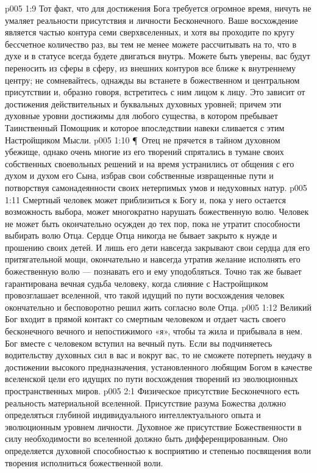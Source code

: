 \vs p005 1:9 Тот факт, что для достижения Бога требуется огромное время, ничуть не умаляет реальности присутствия и личности Бесконечного. Ваше восхождение является частью контура семи сверхвселенных, и хотя вы проходите по кругу бессчетное количество раз, вы тем не менее можете рассчитывать на то, что в духе и в статусе всегда будете двигаться внутрь. Можете быть уверены, вас будут переносить из сферы в сферу, из внешних контуров все ближе к внутреннему центру; не сомневайтесь, однажды вы встанете в божественном и центральном присутствии и, образно говоря, встретитесь с ним лицом к лицу. Это зависит от достижения действительных и буквальных духовных уровней; причем эти духовные уровни достижимы для любого существа, в котором пребывает Таинственный Помощник и которое впоследствии навеки сливается с этим Настройщиком Мысли.
\vs p005 1:10 \P\ Отец не прячется в тайном духовном убежище, однако очень многие из его творений спрятались в тумане своих собственных своевольных решений и на время устранились от общения с его духом и духом его Сына, избрав свои собственные извращенные пути и потворствуя самонадеянности своих нетерпимых умов и недуховных натур.
\vs p005 1:11 Смертный человек может приблизиться к Богу и, пока у него остается возможность выбора, может многократно нарушать божественную волю. Человек не может быть окончательно осужден до тех пор, пока не утратит способности выбирать волю Отца. Сердце Отца никогда не бывает закрыто к нужде и прошению своих детей. И лишь его дети навсегда закрывают свои сердца для его притягательной мощи, окончательно и навсегда утратив желание исполнять его божественную волю --- познавать его и ему уподобляться. Точно так же бывает гарантирована вечная судьба человеку, когда слияние с Настройщиком провозглашает вселенной, что такой идущий по пути восхождения человек окончательно и бесповоротно решил жить согласно воле Отца.
\vs p005 1:12 Великий Бог входит в прямой контакт со смертным человеком и отдает часть своего бесконечного вечного и непостижимого «я», чтобы та жила и прибывала в нем. Бог вместе с человеком вступил на вечный путь. Если вы подчиняетесь водительству духовных сил в вас и вокруг вас, то не сможете потерпеть неудачу в достижении высокого предназначения, установленного любящим Богом в качестве вселенской цели его идущих по пути восхождения творений из эволюционных пространственных миров.
\vs p005 2:1 Физическое присутствие Бесконечного есть реальность материальной вселенной. Присутствие разума Божества должно определяться глубиной индивидуального интеллектуального опыта и эволюционным уровнем личности. Духовное же присутствие Божественности в силу необходимости во вселенной должно быть дифференцированным. Оно определяется духовной способностью к восприятию и степенью посвящения воли творения исполниться божественной воли.
